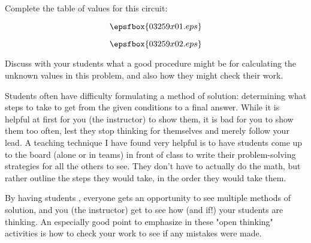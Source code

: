 

Complete the table of values for this circuit:

$$\epsfbox{03259x01.eps}$$







$$\epsfbox{03259x02.eps}$$







Discuss with your students what a good procedure might be for calculating the unknown values in this problem, and also how they might check their work.

\vskip 10pt

Students often have difficulty formulating a method of solution: determining what steps to take to get from the given conditions to a final answer.  While it is helpful at first for you (the instructor) to show them, it is bad for you to show them too often, lest they stop thinking for themselves and merely follow your lead.  A teaching technique I have found very helpful is to have students come up to the board (alone or in teams) in front of class to write their problem-solving strategies for all the others to see.  They don't have to actually do the math, but rather outline the steps they would take, in the order they would take them.

By having students , everyone gets an opportunity to see multiple methods of solution, and you (the instructor) get to see how (and if!) your students are thinking.  An especially good point to emphasize in these "open thinking" activities is how to check your work to see if any mistakes were made.



